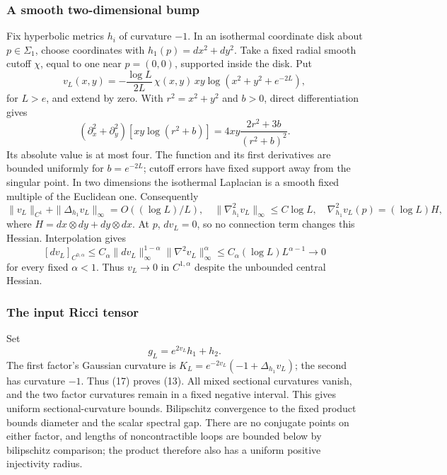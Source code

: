 \documentclass[
  11pt,
]{article}
\begin{document}
\hypertarget{a-smooth-two-dimensional-bump}{%
\subsubsection{A smooth two-dimensional
bump}\label{a-smooth-two-dimensional-bump}}

Fix hyperbolic metrics \(h_i\) of curvature \(-1\). In an isothermal
coordinate disk about \(p\in\Sigma_1\), choose coordinates with
\(h_1(p)=dx^2+dy^2\). Take a fixed radial smooth cutoff \(\chi\), equal
to one near \(p=(0,0)\), supported inside the disk. Put \[
 v_L(x,y)=-\frac{\log L}{2L}\,\chi(x,y)\,xy
                 \log(x^2+y^2+e^{-2L}),
 \tag{15}
\] for \(L>e\), and extend by zero. With \(r^2=x^2+y^2\) and \(b>0\),
direct differentiation gives \[
 (\partial_x^2+\partial_y^2)
     [xy\log(r^2+b)]
 =4xy\frac{2r^2+3b}{(r^2+b)^2}.
 \tag{16}
\] Its absolute value is at most four. The function and its first
derivatives are bounded uniformly for \(b=e^{-2L}\); cutoff errors have
fixed support away from the singular point. In two dimensions the
isothermal Laplacian is a smooth fixed multiple of the Euclidean one.
Consequently \[
 \|v_L\|_{C^1}+\|\Delta_{h_1}v_L\|_\infty=O((\log L)/L),
 \quad \|\nabla_{h_1}^2v_L\|_\infty\le C\log L,
 \quad \nabla_{h_1}^2v_L(p)=(\log L)H,
 \tag{17}
\] where \(H=dx\otimes dy+dy\otimes dx\). At \(p\), \(dv_L=0\), so no
connection term changes this Hessian. Interpolation gives \[
 [dv_L]_{C^{0,\alpha}}
 \le C_\alpha\|dv_L\|_\infty^{1-\alpha}
                    \|\nabla^2v_L\|_\infty^\alpha
 \le C_\alpha(\log L)L^{\alpha-1}\longrightarrow0
\] for every fixed \(\alpha<1\). Thus \(v_L\to0\) in \(C^{1,\alpha}\)
despite the unbounded central Hessian.

\hypertarget{the-input-ricci-tensor}{%
\subsubsection{The input Ricci tensor}\label{the-input-ricci-tensor}}

Set \[
 g_L=e^{2v_L}h_1+h_2.
 \tag{18}
\] The first factor's Gaussian curvature is
\(K_L=e^{-2v_L}(-1+\Delta_{h_1}v_L)\); the second has curvature \(-1\).
Thus (17) proves (13). All mixed sectional curvatures vanish, and the
two factor curvatures remain in a fixed negative interval. This gives
uniform sectional-curvature bounds. Bilipschitz convergence to the fixed
product bounds diameter and the scalar spectral gap. There are no
conjugate points on either factor, and lengths of noncontractible loops
are bounded below by bilipschitz comparison; the product therefore also
has a uniform positive injectivity radius.
\end{document}
